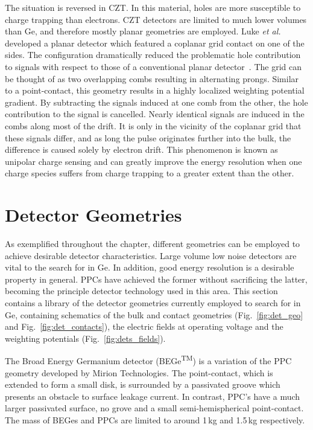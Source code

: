 The situation is reversed in CZT. In this material, holes are more susceptible to charge trapping than electrons. CZT detectors are limited to much lower volumes than Ge, and therefore mostly planar geometries are employed. Luke \textit{et al.} developed a planar detector which featured a coplanar grid contact on one of the sides. The configuration dramatically reduced the problematic hole contribution to signals with respect to those of a conventional planar detector~\cite{czt_unipolar}. The grid can be thought of as two overlapping combs resulting in alternating prongs. Similar to a point-contact, this geometry results in a highly localized weighting potential gradient. By subtracting the signals induced at one comb from the other, the hole contribution to the signal is cancelled. Nearly identical signals are induced in the combs along most of the drift. It is only in the vicinity of the coplanar grid that these signals differ, and as long the pulse originates further into the bulk, the difference is caused solely by electron drift. This phenomenon is known as unipolar charge sensing and can greatly improve the energy resolution when one charge species suffers from charge trapping to a greater extent than the other. 

\section{Detector Geometries}\label{sec:det_geo}

As exemplified throughout the chapter, different geometries can be employed to achieve desirable detector characteristics. Large volume low noise detectors are vital to the search for \novbb{} in Ge. In addition, good energy resolution is a desirable property in general. PPCs have achieved the former without sacrificing the latter, becoming the principle detector technology used in this area. This section contains a library of the detector geometries currently employed to search for \novbb{} in Ge, containing schematics of the bulk and contact geometries (Fig.~\ref{fig:det_geo} and Fig.~\ref{fig:det_contacts}), the electric fields at operating voltage and the weighting potentials (Fig.~\ref{fig:dets_fields}). 

The Broad Energy Germanium detector (BEGe\textsuperscript{\tiny TM}) is a variation of the PPC geometry developed by Mirion Technologies. The point-contact, which is extended to form a small disk, is surrounded by a passivated groove which presents an obstacle to surface leakage current. In contrast, PPC's have a much larger passivated surface, no grove and a small semi-hemispherical point-contact. The mass of BEGes and PPCs are limited to around 1\,kg and 1.5\,kg respectively.

